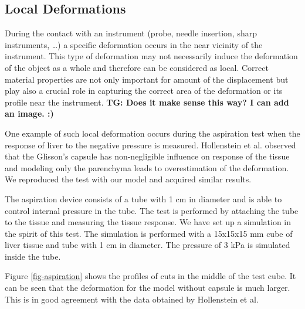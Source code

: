 \documentclass{llncs}
\newcommand{\TG}[1]{{\color{blue}\textbf{TG: #1}}}
\begin{document}
\subsection{Local Deformations} %

During the contact with an instrument (probe, needle insertion, sharp
instruments, \ldots) a specific deformation occurs in the near vicinity of
the instrument. This type of deformation may not necessarily induce the
deformation of the object as a whole and therefore can be considered as
local. Correct material properties are not only important for amount of the
displacement but play also a crucial role in capturing the correct area of
the deformation or its profile near the instrument.
\TG{Does it make sense this way? I can add an image. :)}

One example of such local deformation occurs during the aspiration test
when the response of liver to the negative pressure is measured.
Hollenstein et al. \cite{Hollenstein2006} observed that the Glisson's
capsule has non-negligible influence on response of the tissue and modeling
only the parenchyma leads to overestimation of the deformation. We
reproduced the test with our model and acquired similar results.

The aspiration device consists of a tube with 1 cm in diameter and is able
to control internal pressure in the tube. The test is performed by
attaching the tube to the tissue and measuring the tissue response. We
have set up a simulation in the spirit of this test. 
The simulation is performed with a 15x15x15 mm cube of liver tissue and tube
with 1 cm in diameter. The pressure of 3 kPa is simulated inside the tube.

Figure \ref{fig-aspiration} shows the profiles of cuts in the middle of the
test cube. It can be seen that the
deformation for the model without capsule is much larger. This is in good
agreement with the data obtained by Hollenstein et al.
\end{document}
